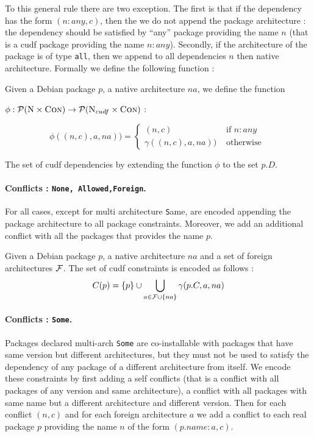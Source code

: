 To this general rule there are two exception. The first is that if the
dependency has the form $(n:any,c)$, then the we do not append the
package architecture : the dependency should be satisfied by ``any''
package providing the name $n$ (that is a cudf package providing the name
$n:any$). Secondly, if the architecture of the package
is of type \texttt{all}, then we append to all dependencies $n$ then
native architecture. Formally we define the following function :

Given a Debian package $p$, a native architecture $na$, we define
the function 

$\phi : \power{\names\times\con} \rightarrow \power{\names_{cudf}\times\con}$ :

\[
  \phi ((n,c),a,na)) = \left\{ 
    \begin{array}{rl}
      (n,c)               & \mbox{ if } n:any \\
      \gamma((n,c),a,na)) & \mbox{ otherwise }
    \end{array} 
  \right.
\]

The set of cudf dependencies by extending the function $\phi$ to the
set $p.D$.

\paragraph{Conflicts : \texttt{None, Allowed,Foreign}.}
For all cases, except for multi architecture {\texttt Same}, are
encoded appending the package architecture to all package constraints.
Moreover, we add an additional conflict with all the packages that
provides the name $p$. 

Given a Debian package $p$, a native architecture $na$ and a set of
foreign architectures $\cal{F}$. The set of cudf constraints is
encoded as follows : 
\[
  C(p) = \{ p \} \cup \bigcup_{a \in \cal{F} \cup \{ na \} } \gamma(p.C,a,na)
\]

\paragraph{Conflicts : \texttt{Some}.}

Packages declared multi-arch \texttt{Some} are co-installable with
packages that have same version but different architectures, but they
must not be used to satisfy the dependency of any package of a
different architecture from itself. We encode these constraints by
first adding a self conflicts (that is a conflict with all packages of
any version and same architecture), a conflict with all packages with
same name but a different architecture and different version. Then for
each conflict $(n,c)$ and for each foreign architecture $a$ we add a
conflict to each real package $p$ providing the name $n$ of the form
$(p.name:a,c)$.

